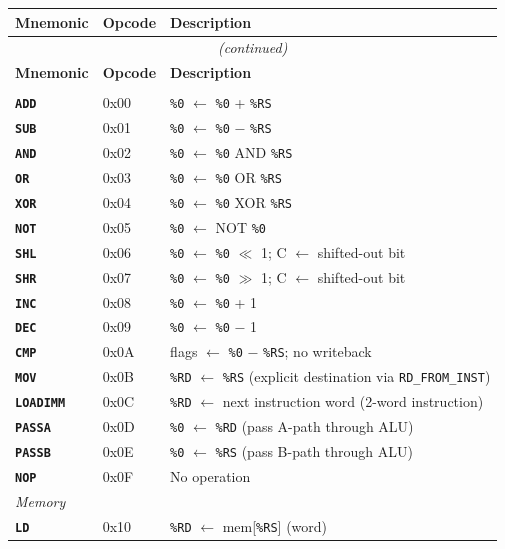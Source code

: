 \documentclass[a4paper,12pt]{report}
\newcommand{\field}[1]{\texttt{\small #1}}
\newcommand{\reg}[1]{\texttt{\%#1}}
\newcommand{\instr}[1]{\texttt{\textbf{#1}}}
\begin{document}
\begin{longtable}{lll}
\toprule
\textbf{Mnemonic} & \textbf{Opcode} & \textbf{Description} \\
\midrule
\endfirsthead
\multicolumn{3}{c}{\textit{(continued)}} \\
\toprule
\textbf{Mnemonic} & \textbf{Opcode} & \textbf{Description} \\
\midrule
\endhead
\bottomrule
\endlastfoot

\multicolumn{3}{l}{\textit{Arithmetic and Logic}} \\
\midrule
\instr{ADD}     & 0x00 & \reg{0} $\leftarrow$ \reg{0} + \reg{RS} \\
\instr{SUB}     & 0x01 & \reg{0} $\leftarrow$ \reg{0} $-$ \reg{RS} \\
\instr{AND}     & 0x02 & \reg{0} $\leftarrow$ \reg{0} AND \reg{RS} \\
\instr{OR}      & 0x03 & \reg{0} $\leftarrow$ \reg{0} OR \reg{RS} \\
\instr{XOR}     & 0x04 & \reg{0} $\leftarrow$ \reg{0} XOR \reg{RS} \\
\instr{NOT}     & 0x05 & \reg{0} $\leftarrow$ NOT \reg{0} \\
\instr{SHL}     & 0x06 & \reg{0} $\leftarrow$ \reg{0} $\ll$ 1; C $\leftarrow$ shifted-out bit \\
\instr{SHR}     & 0x07 & \reg{0} $\leftarrow$ \reg{0} $\gg$ 1; C $\leftarrow$ shifted-out bit \\
\instr{INC}     & 0x08 & \reg{0} $\leftarrow$ \reg{0} + 1 \\
\instr{DEC}     & 0x09 & \reg{0} $\leftarrow$ \reg{0} $-$ 1 \\
\instr{CMP}     & 0x0A & flags $\leftarrow$ \reg{0} $-$ \reg{RS}; no writeback \\
\instr{MOV}     & 0x0B & \reg{RD} $\leftarrow$ \reg{RS} (explicit destination via \field{RD\_FROM\_INST}) \\
\instr{LOADIMM} & 0x0C & \reg{RD} $\leftarrow$ next instruction word (2-word instruction) \\
\instr{PASSA}   & 0x0D & \reg{0} $\leftarrow$ \reg{RD} (pass A-path through ALU) \\
\instr{PASSB}   & 0x0E & \reg{0} $\leftarrow$ \reg{RS} (pass B-path through ALU) \\
\instr{NOP}     & 0x0F & No operation \\
\midrule
\multicolumn{3}{l}{\textit{Memory}} \\
\midrule
\instr{LD}      & 0x10 & \reg{RD} $\leftarrow$ mem[\reg{RS}] (word) \\

\end{longtable}
\end{document}
